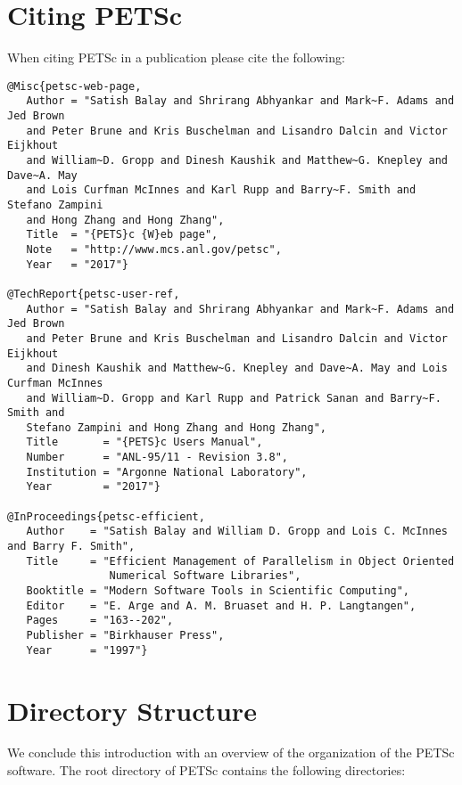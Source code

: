 {{%

\section{Citing PETSc}

When citing PETSc in a publication please cite the following:
\begin{verbatim}
@Misc{petsc-web-page,
   Author = "Satish Balay and Shrirang Abhyankar and Mark~F. Adams and Jed Brown
   and Peter Brune and Kris Buschelman and Lisandro Dalcin and Victor Eijkhout
   and William~D. Gropp and Dinesh Kaushik and Matthew~G. Knepley and Dave~A. May
   and Lois Curfman McInnes and Karl Rupp and Barry~F. Smith and Stefano Zampini
   and Hong Zhang and Hong Zhang",
   Title  = "{PETS}c {W}eb page",
   Note   = "http://www.mcs.anl.gov/petsc",
   Year   = "2017"}

@TechReport{petsc-user-ref,
   Author = "Satish Balay and Shrirang Abhyankar and Mark~F. Adams and Jed Brown
   and Peter Brune and Kris Buschelman and Lisandro Dalcin and Victor Eijkhout
   and Dinesh Kaushik and Matthew~G. Knepley and Dave~A. May and Lois Curfman McInnes
   and William~D. Gropp and Karl Rupp and Patrick Sanan and Barry~F. Smith and
   Stefano Zampini and Hong Zhang and Hong Zhang",
   Title       = "{PETS}c Users Manual",
   Number      = "ANL-95/11 - Revision 3.8",
   Institution = "Argonne National Laboratory",
   Year        = "2017"}

@InProceedings{petsc-efficient,
   Author    = "Satish Balay and William D. Gropp and Lois C. McInnes and Barry F. Smith",
   Title     = "Efficient Management of Parallelism in Object Oriented
                Numerical Software Libraries",
   Booktitle = "Modern Software Tools in Scientific Computing",
   Editor    = "E. Arge and A. M. Bruaset and H. P. Langtangen",
   Pages     = "163--202",
   Publisher = "Birkhauser Press",
   Year      = "1997"}
\end{verbatim}


\section{Directory Structure}
\label{sec_directory}

We conclude this introduction with an overview of the
organization of the PETSc software.
The root directory of PETSc contains the following directories:

}}
